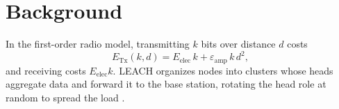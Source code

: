 \chapter{Background}
\label{ch:background}

In the first-order radio model, transmitting $k$ bits over distance $d$ costs
\begin{equation}
  E_{\mathrm{Tx}}(k, d) = E_{\mathrm{elec}}\,k + \varepsilon_{\mathrm{amp}}\,k\,d^{2},
  \label{eq:radio}
\end{equation}
and receiving costs $E_{\mathrm{elec}} k$. LEACH organizes nodes into clusters whose heads
aggregate data and forward it to the base station, rotating the head role at random to spread
the load \citep{heinzelman2000}.

